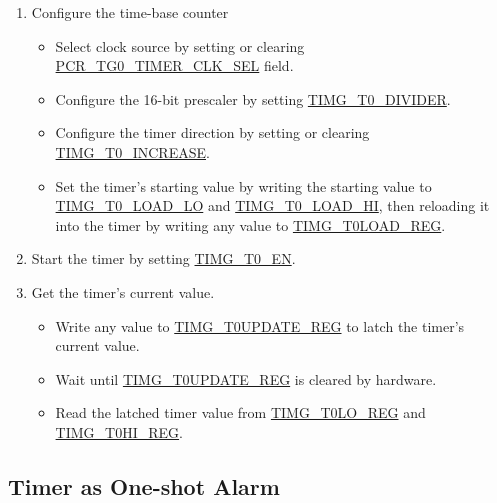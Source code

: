 \documentclass[main\_\_EN.tex]{subfiles}
\begin{document}
\begin{enumerate}
    \item Configure the time-base counter
    \begin{itemize}
        \item Select clock source by setting or clearing \hyperref[fielddesc:PCRTG0TIMERCLKSEL]{PCR\_TG0\_TIMER\_CLK\_SEL} field.
        \item Configure the 16-bit prescaler by setting \hyperref[fielddesc:TIMGTXDIVIDER]{TIMG\_T0\_DIVIDER}.
        \item Configure the timer direction by setting or clearing \hyperref[fielddesc:TIMGTXINCREASE]{TIMG\_T0\_INCREASE}.
        \item Set the timer's starting value by writing the starting value to \hyperref[fielddesc:TIMGTXLOADLO]{TIMG\_T0\_LOAD\_LO} and \hyperref[fielddesc:TIMGTXLOADHI]{TIMG\_T0\_LOAD\_HI}, then reloading it into the timer by writing any value to \hyperref[regdesc:TIMGTXLOADREG]{TIMG\_T0LOAD\_REG}.
    \end{itemize}
    \item Start the timer by setting \hyperref[fielddesc:TIMGTXEN]{TIMG\_T0\_EN}.
    \item Get the timer's current value.
    \begin{itemize}
        \item  Write any value to \hyperref[regdesc:TIMGTXUPDATEREG]{TIMG\_T0UPDATE\_REG} to latch the timer's current value.
        \item Wait until \hyperref[regdesc:TIMGTXUPDATEREG]{TIMG\_T0UPDATE\_REG} is cleared by hardware.
        \item  Read the latched timer value from \hyperref[regdesc:TIMGTXLOREG]{TIMG\_T0LO\_REG} and \hyperref[regdesc:TIMGTXHIREG]{TIMG\_T0HI\_REG}.
    \end{itemize}
\end{enumerate}

\subsection{Timer as One-shot Alarm}
\label{sec:timg-func-descr-timer-alarm}
\end{document}
